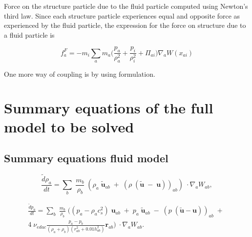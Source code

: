 \documentclass[preprint,12pt]{elsarticle}
\newcommand{\ten}[1]{\ensuremath{\mathbf{#1}}}
\begin{document}
Force on the structure particle due to the fluid particle computed using
Newton's third law. Since each structure particle experiences equal and
opposite force as experienced by the fluid particle, the expression for the
force on structure due to a fluid particle is

\begin{equation}
  f_a^F = -m_i \sum_{a} m_a \bigg(\frac{p_a}{\rho_{a}^2} +
  \frac{p_i}{\rho_{i}^2} + \Pi_{ai} \bigg) \nabla_{a} W(x_{ai})
\end{equation}


One more way of coupling is by using \citet{khayyer2018enhanced} formulation.






\section{Summary equations of the full model to be solved}

\subsection{Summary equations fluid model}

\begin{equation}
  \label{eq:sph-discretization-continuity}
  \frac{\tilde{d}\rho_a}{dt} = \sum_{b} \; \frac{m_b}{\rho_{b}} \; (
  \rho_{a} \; \tilde{\ten{u}}_{ab} \; + \;
  (\rho \; (\tilde{\ten{u}} \; - \;
  \ten{u}))_{ab}) \; \cdot \nabla_{a} W_{ab},
\end{equation}

\begin{multline}
  \label{eq:sph-discretization-edac}
  \frac{\tilde{d}p_a}{dt} = \sum_{b} \; \frac{m_b}{\rho_{b}} \; \bigg(
  (p_{a} - \rho_{a} c_{s}^2) \; \ten{u}_{ab} \; + \;
  p_{a} \; \tilde{\ten{u}}_{ab} \; - \;
  (p \; (\tilde{\ten{u}} - \ten{u}))_{ab} \; + \; \\
  4 \; \nu_{edac}
  \frac{p_a - p_b}{(\rho_a + \rho_b) (r^2_{ab} + 0.01 h_{ab}^{2})} \ten{r}_{ab}
  \bigg) \; \cdot \nabla_{a} W_{ab}.
\end{multline}
%
\end{document}
